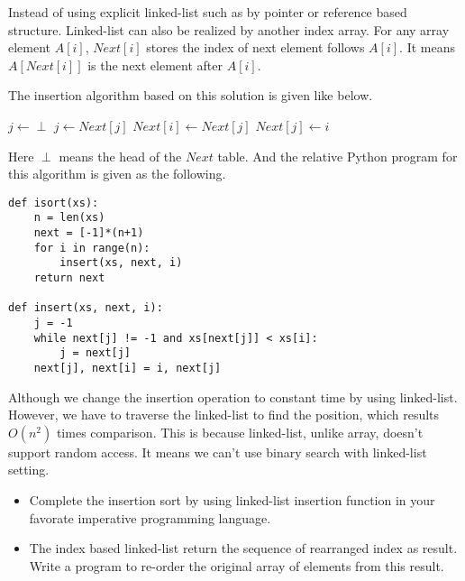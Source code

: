 \documentclass{article}
\begin{document}
Instead of using explicit linked-list such as by pointer or reference
based structure. Linked-list can also be realized by another index array.
For any array element $A[i]$, $Next[i]$ stores the index of next element
follows $A[i]$. It means $A[Next[i]]$ is the next element after $A[i]$.

The insertion algorithm based on this solution is given like below.

\begin{algorithmic}
  \State $j \gets \perp$
    \State $j \gets Next[j]$
  \EndWhile
  \State $Next[i] \gets Next[j]$
  \State $Next[j] \gets i$
\EndFunction
\end{algorithmic}

Here $\perp$ means the head of the $Next$ table.
And the relative Python program for this algorithm is given as the following.

\lstset{language=Python}
\begin{lstlisting}
def isort(xs):
    n = len(xs)
    next = [-1]*(n+1)
    for i in range(n):
        insert(xs, next, i)
    return next

def insert(xs, next, i):
    j = -1
    while next[j] != -1 and xs[next[j]] < xs[i]:
        j = next[j]
    next[j], next[i] = i, next[j]
\end{lstlisting}

Although we change the insertion operation to constant time by using
linked-list. However, we have to traverse the linked-list to find the
position, which results $O(n^2)$ times comparison. This is because
linked-list, unlike array, doesn't support random access. It means we
can't use binary search with linked-list setting.

\begin{Exercise}
\begin{itemize}
\item Complete the insertion sort by using linked-list insertion function
in your favorate imperative programming language.
\item The index based linked-list return the sequence of rearranged index
as result. Write a program to re-order the original array of elements from
this result.
\end{itemize}
\end{Exercise}

\end{document}
